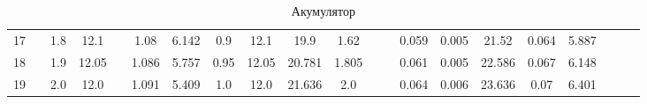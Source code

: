 \documentclass[a4paper,12pt]{article}
\begin{document}
\begin{table}[htp]
\begin{adjustwidth}{-3.5cm}{}
\begin{tabular}{|c|c|c|c|c|c|c|c|c|c|c|c|c|c|c|c|c|c|c|c|c|}
17    &                      & 1.8 & 12.1  &                       & 1.08  & 6.142   & 0.9  & 12.1  & 19.9   & 1.62  &                        &                         & 0.059     & 0.005     & 21.52  & 0.064  & 5.887      &                         &                         &                         \\ \cline{1-1} \cline{3-4} \cline{6-11} \cline{14-18}
18    &                      & 1.9 & 12.05 &                       & 1.086 & 5.757   & 0.95 & 12.05 & 20.781 & 1.805 &                        &                         & 0.061     & 0.005     & 22.586 & 0.067  & 6.148      &                         &                         &                         \\ \cline{1-1} \cline{3-4} \cline{6-11} \cline{14-18}
19    &                      & 2.0 & 12.0  &                       & 1.091 & 5.409   & 1.0  & 12.0  & 21.636 & 2.0   &                        &                         & 0.064     & 0.006     & 23.636 & 0.07   & 6.401      &                         &                         &                         \\ \hline
\end{tabular}
\end{adjustwidth}
\label{table:accumulator}
	\caption{Акумулятор}
\end{table}

























\newpage
{}
\recalctypearea
\end{document}

